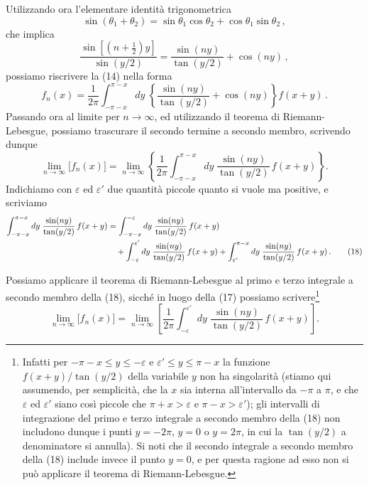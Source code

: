 \documentclass[11pt, a4paper]{book}
\numberwithin{equation}{section}
\begin{document}
Utilizzando ora l'elementare identità trigonometrica
\begin{equation}
  \sin(\theta_1+\theta_2) = \sin\theta_1\cos\theta_2 + \cos\theta_1\sin\theta_2\,, \tag{15a}
\end{equation}
che implica
\begin{equation}
  \frac{\sin\!\left[(n+\frac{1}{2})y\right]}{\sin(y/2)}
  = \frac{\sin(ny)}{\tan(y/2)} + \cos(ny)\,, \tag{15b}
\end{equation}
possiamo riscrivere la (14) nella forma
\begin{equation}
  f_n(x) = \frac{1}{2\pi}\int_{-\pi-x}^{\pi-x} dy\;
  \left\{\frac{\sin(ny)}{\tan(y/2)}+\cos(ny)\right\}f(x+y)\,. \tag{16}
\end{equation}
Passando ora al limite per $n\to\infty$, ed utilizzando il teorema di Riemann-Lebesgue, possiamo trascurare il secondo termine a secondo membro, scrivendo dunque
\begin{equation}
  \lim_{n\to\infty}\bigl[f_n(x)\bigr]
  = \lim_{n\to\infty}\left\{\frac{1}{2\pi}\int_{-\pi-x}^{\pi-x} dy\;
  \frac{\sin(ny)}{\tan(y/2)}\,f(x+y)\right\}. \tag{17}
\end{equation}
Indichiamo con $\varepsilon$ ed $\varepsilon'$ due quantità piccole quanto si vuole ma positive, e scriviamo
\begin{align}
  \int_{-\pi-x}^{\pi-x} dy\;\frac{\sin(ny)}{\tan(y/2)}\,f(x+y)
  &= \int_{-\pi-x}^{-\varepsilon} dy\;\frac{\sin(ny)}{\tan(y/2)}\,f(x+y) \notag\\
  &\quad + \int_{-\varepsilon}^{\varepsilon'} dy\;\frac{\sin(ny)}{\tan(y/2)}\,f(x+y)
  + \int_{\varepsilon'}^{\pi-x} dy\;\frac{\sin(ny)}{\tan(y/2)}\,f(x+y)\,. \tag{18}
\end{align}

Possiamo applicare il teorema di Riemann-Lebesgue al primo e terzo integrale a secondo membro della (18), sicché in luogo della (17) possiamo scrivere\footnote{Infatti per $-\pi-x \leq y \leq -\varepsilon$ e $\varepsilon' \leq y \leq \pi-x$ la funzione $f(x+y)/\tan(y/2)$ della variabile $y$ non ha singolarità (stiamo qui assumendo, per semplicità, che la $x$ sia interna all'intervallo da $-\pi$ a $\pi$, e che $\varepsilon$ ed $\varepsilon'$ siano così piccole che $\pi+x > \varepsilon$ e $\pi-x > \varepsilon'$); gli intervalli di integrazione del primo e terzo integrale a secondo membro della (18) non includono dunque i punti $y=-2\pi$, $y=0$ o $y=2\pi$, in cui la $\tan(y/2)$ a denominatore si annulla). Si noti che il secondo integrale a secondo membro della (18) include invece il punto $y=0$, e per questa ragione ad esso non si può applicare il teorema di Riemann-Lebesgue.}
\begin{equation}
  \lim_{n\to\infty}\bigl[f_n(x)\bigr]
  = \lim_{n\to\infty}\left[\frac{1}{2\pi}\int_{-\varepsilon}^{\varepsilon'} dy\;
  \frac{\sin(ny)}{\tan(y/2)}\,f(x+y)\right]. \tag{19}
\end{equation}
\end{document}
